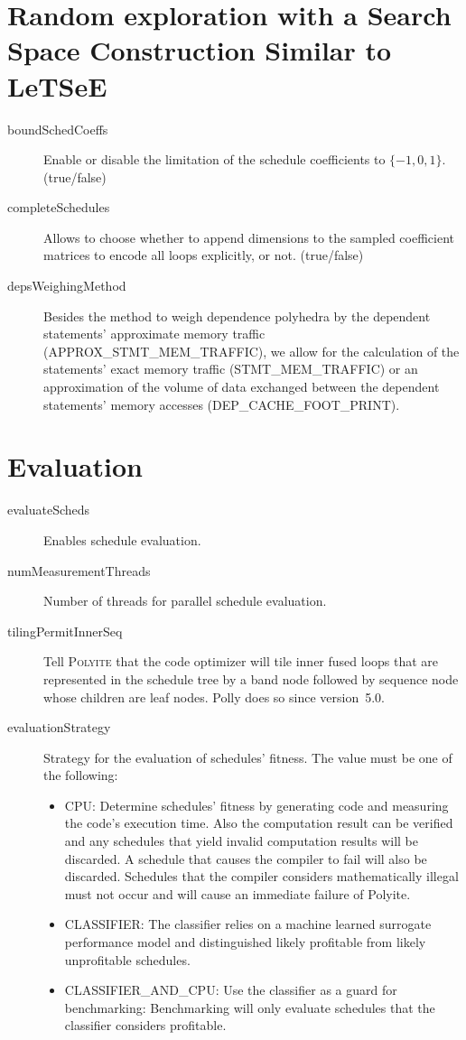\documentclass{article}
\begin{document}
\section{Random exploration with a Search Space Construction Similar to LeTSeE}
\begin{description}
  \item[boundSchedCoeffs] Enable or disable the limitation of the
    schedule coefficients to $\lbrace -1, 0, 1 \rbrace$. (true/false)
  \item[completeSchedules] Allows to choose whether to append
    dimensions to the sampled coefficient matrices to encode all loops
    explicitly, or not. (true/false)
  \item[depsWeighingMethod] Besides the method to weigh dependence polyhedra by
    the dependent statements' approximate memory traffic
    (APPROX\_STMT\_MEM\_TRAFFIC), we allow for the calculation of the
    statements' exact memory traffic (STMT\_MEM\_TRAFFIC) or an approximation
    of the volume of data exchanged between the dependent statements' memory
    accesses (DEP\_CACHE\_FOOT\_PRINT).
\end{description}

\section{Evaluation}
\begin{description}
  \item[evaluateScheds] Enables schedule evaluation.
  \item[numMeasurementThreads] Number of threads for parallel schedule
    evaluation.
  \item[tilingPermitInnerSeq] Tell \textsc{Polyite} that the code optimizer
    will tile inner fused loops that are represented in the schedule tree by a
    band node followed by sequence node whose children are leaf nodes. Polly
    does so since version~5.0.
    \item[evaluationStrategy] Strategy for the evaluation of schedules'
    fitness. The value must be one of the following:
    \begin{itemize}
      \item CPU: Determine schedules' fitness by generating code and measuring
      the code's execution time. Also the computation result can be verified and
      any schedules that yield invalid computation results will be discarded. A
      schedule that causes the compiler to fail will also be discarded.
      Schedules that the compiler considers mathematically illegal must not
      occur and will cause an immediate failure of Polyite.
      \item CLASSIFIER: The classifier relies on a machine learned surrogate
      performance model and distinguished likely profitable from likely
      unprofitable schedules.
      \item CLASSIFIER\_AND\_CPU: Use the classifier as a guard for
      benchmarking: Benchmarking will only evaluate schedules that the
      classifier considers profitable.
    \end{itemize}
\end{description}
\end{document}
